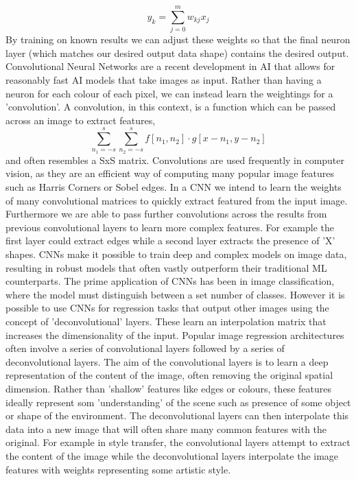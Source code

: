 \documentclass[ %
                    author={Gavin Parker},
                supervisor={Dr. Neill Campbell},
                    degree={MEng},
                     title={Deep Siamese Networks for Illumination Estimation from Stereo Images},
                  subtitle={},
                      type={research},
                      year={2018} ]{dissertation}
\begin{document}
\[y_k = \sum_{j=0}^{m}{w_{kj}x_j}\]
 By training on known results we can adjust these weights so that the final neuron layer (which matches our desired output data shape) contains the desired output.
\newline
Convolutional Neural Networks are a recent development in AI that allows for reasonably fast AI models that take images as input. Rather than having a neuron for each colour of each pixel, we can instead learn the weightings for a 'convolution'. A convolution, in this context, is a function which can be passed across an image to extract features,
\[\sum_{n_1=-s}^{s}{\sum_{n_2=-s}^{s}{f[n_1, n_2]\cdot g[x-n_1,y-n_2]}} \]
and often resembles a SxS matrix. Convolutions are used frequently in computer vision, as they are an efficient way of computing many popular image features such as Harris Corners or Sobel edges. In a CNN we intend to learn the weights of many convolutional matrices to quickly extract featured from the input image. Furthermore we are able to pass further convolutions across the results from previous convolutional layers to learn more complex features. For example the first layer could extract edges while a second layer extracts the presence of 'X' shapes. CNNs make it possible to train deep and complex models on image data, resulting in robust models that often vastly outperform their traditional ML counterparts. The prime application of CNNs has been in image classification, where the model must distinguish between a set number of classes. However it is possible to use CNNs for regression tasks that output other images using the concept of 'deconvolutional' layers. These learn an interpolation matrix that increases the dimensionality of the input. Popular image regression architectures often involve a series of convolutional layers followed by a series of deconvolutional layers. The aim of the convolutional layers is to learn a deep representation of the content of the image, often removing the original spatial dimension. Rather than 'shallow' features like edges or colours, these features ideally represent som 'understanding' of the scene such as presence of some object or shape of the environment. The deconvolutional layers can then interpolate this data into a new image that will often share many common features with the original. For example in style transfer, the convolutional layers attempt to extract the content of the image while the deconvolutional layers interpolate the image features with weights representing some artistic style.
\newline
\end{document}
